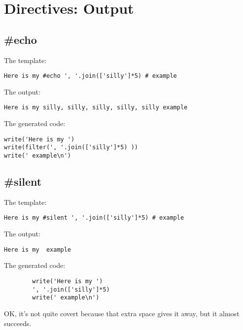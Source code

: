 \section{Directives: Output}
\label{output}

\subsection{\#echo}
\label{output.echo}

The template:
\begin{verbatim}
Here is my #echo ', '.join(['silly']*5) # example
\end{verbatim}

The output:
\begin{verbatim}
Here is my silly, silly, silly, silly, silly example
\end{verbatim}

The generated code:
\begin{verbatim}
write('Here is my ')
write(filter(', '.join(['silly']*5) ))
write(' example\n')
\end{verbatim}

\subsection{\#silent}
\label{output.silent}

The template:
\begin{verbatim}
Here is my #silent ', '.join(['silly']*5) # example
\end{verbatim}

The output:
\begin{verbatim}
Here is my  example
\end{verbatim}

The generated code:
\begin{verbatim}
        write('Here is my ')
        ', '.join(['silly']*5) 
        write(' example\n')
\end{verbatim}

OK, it's not quite covert because that extra space gives it away, but it 
almost succeeds.



